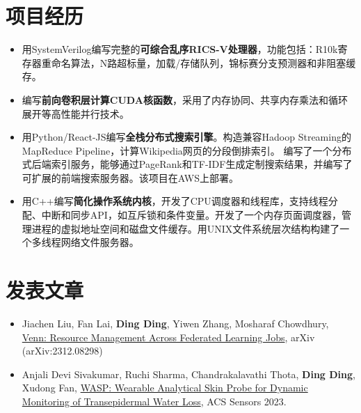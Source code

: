 \documentclass{resume}
\begin{document}
\section{项目经历}
\begin{itemize}[parsep=0.2ex]
  \item 用SystemVerilog编写完整的\textbf{可综合乱序RICS-V处理器}，功能包括：R10k寄存器重命名算法，N路超标量，加载/存储队列，锦标赛分支预测器和非阻塞缓存。
  \item 编写\textbf{前向卷积层计算CUDA核函数}，采用了内存协同、共享内存乘法和循环展开等高性能并行技术。
  \item 用Python/React-JS编写\textbf{全栈分布式搜索引擎}。构造兼容Hadoop Streaming的MapReduce Pipeline，计算Wikipedia网页的分段倒排索引。
        编写了一个分布式后端索引服务，能够通过PageRank和TF-IDF生成定制搜索结果，并编写了可扩展的前端搜索服务器。该项目在AWS上部署。
  \item 用C++编写\textbf{简化操作系统内核}，开发了CPU调度器和线程库，支持线程分配、中断和同步API，如互斥锁和条件变量。开发了一个内存页面调度器，管理进程的虚拟地址空间和磁盘文件缓存。用UNIX文件系统层次结构构建了一个多线程网络文件服务器。
\end{itemize}

\section{发表文章}
\begin{itemize}[parsep=0.2ex]
  \item Jiachen Liu, Fan Lai, \textbf{Ding Ding}, Yiwen Zhang, Mosharaf Chowdhury, \href{https://arxiv.org/abs/2312.08298}{Venn: Resource Management Across Federated Learning Jobs}, arXiv (arXiv:2312.08298)
  \item Anjali Devi Sivakumar, Ruchi Sharma, Chandrakalavathi Thota, \textbf{Ding Ding}, Xudong Fan, \href{https://pubs.acs.org/doi/10.1021/acssensors.3c01936}{WASP: Wearable Analytical Skin Probe for Dynamic Monitoring of Transepidermal Water Loss}, ACS Sensors 2023.
\end{itemize}
\end{document}
